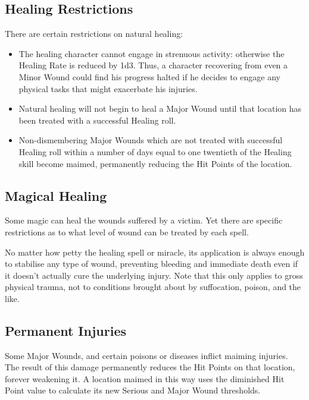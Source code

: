 \documentclass[10pt]{article}
\begin{document}
\subsection{Healing Restrictions}
\label{sec:healing-restrictions}
There are certain restrictions on natural healing:
\begin{itemize}[leftmargin=*]
    \item The healing character cannot engage in strenuous activity: otherwise the Healing Rate is reduced by 1d3. Thus, a character recovering from even a Minor Wound could find his progress halted if he decides to engage any physical tasks that might exacerbate his injuries.
    \item Natural healing will not begin to heal a Major Wound until that location has been treated with a successful Healing roll.
    \item Non-dismembering Major Wounds which are not treated with successful Healing roll within a number of days equal to one twentieth of the Healing skill become maimed, permanently reducing the Hit Points of the location.
\end{itemize}

\subsection{Magical Healing}
\label{sec:magic-healing}
Some magic can heal the wounds suffered by a victim. Yet there are specific restrictions as to what level of wound can be treated by each spell. 

No matter how petty the healing spell or miracle, its application is always enough to stabilise any type of wound, preventing bleeding and immediate death even if it doesn't actually cure the underlying injury. Note that this only applies to gross physical trauma, not to conditions brought about by suffocation, poison, and the like.

\subsection{Permanent Injuries}
\label{sec:permanent-injuries}
Some Major Wounds, and certain poisons or diseases inflict maiming injuries. The result of this damage permanently reduces the Hit Points on that location, forever weakening it. A location maimed in this way uses the diminished Hit Point value to calculate its new Serious and Major Wound thresholds.
\end{document}
